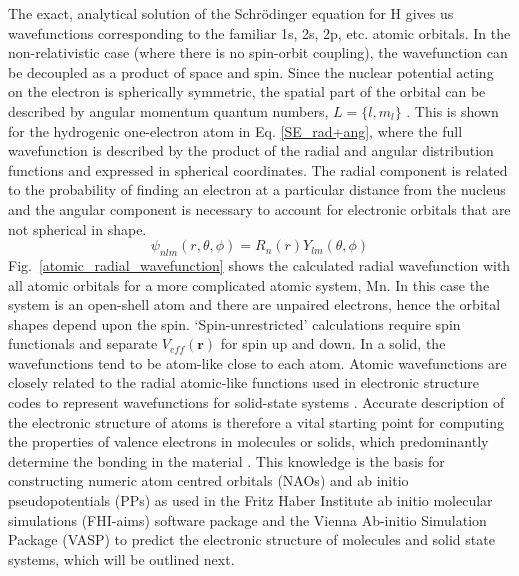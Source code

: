 \documentclass[11pt, twoside]{report}
\begin{document}
The exact, analytical solution of the Schr{\"o}dinger equation for H gives us wavefunctions corresponding to the familiar 1s, 2s, 2p, etc. atomic orbitals. 
In the non-relativistic case (where there is no spin-orbit coupling), the wavefunction can be decoupled as a product of space and spin. Since the nuclear potential acting on the electron is spherically symmetric, the spatial part of the orbital can be described by angular momentum quantum numbers, $L=\{l,m_l\}$ \cite{RichardMartin_Ch10}. This is shown for the hydrogenic one-electron atom in Eq. \ref{SE_rad+ang}, where the full wavefunction is described by the product of the radial and angular distribution functions and expressed in spherical coordinates. The radial component is related to the probability of finding an electron at a particular distance from the nucleus and the angular component is necessary to account for electronic orbitals that are not spherical in shape.
\begin{equation}\label{SE_rad+ang}
\psi_{nlm}(r, \theta, \phi) = R_n(r) Y_{lm}(\theta, \phi)
\end{equation}
Fig.~\ref{atomic_radial_wavefunction} shows the calculated radial wavefunction with all atomic orbitals for a more complicated atomic system, Mn. In this case the system is an open-shell atom and there are unpaired electrons, hence the orbital shapes depend upon the spin. `Spin-unrestricted' calculations require spin functionals and separate $V_{eff}(\mathbf{r})$ for spin up and down. 
In a solid, the wavefunctions tend to be atom-like close to each atom. Atomic wavefunctions are closely related to the radial atomic-like functions used in electronic structure codes to represent wavefunctions for solid-state systems \cite{RichardMartin_Ch10}. Accurate description of the electronic structure of atoms is therefore a vital starting point for computing the properties of valence electrons in molecules or solids, which predominantly determine the bonding in the material \cite{RichardMartin_Ch11}. This knowledge is the basis for constructing numeric atom centred orbitals (NAOs) and ab initio pseudopotentials (PPs) as used in the Fritz Haber Institute ab initio molecular simulations (FHI-aims) \cite{FHI-aims} software package and the Vienna Ab-initio Simulation Package (VASP) \cite{VASP} to predict the electronic structure of molecules and solid state systems, which will be outlined next.
\end{document}
